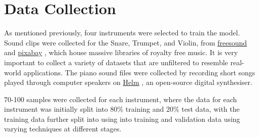 \documentclass[class=report,11pt,crop=false]{standalone}
\begin{document}
\ifstandalone
\tableofcontents
\fi
\section{Data Collection \label{ch: data_collection}}

As mentioned previously, four instruments were selected to train the model. Sound clips were collected for the Snare, Trumpet, and Violin, from \href{https://freesound.org/}{freesound} \cite{freesound} and \href{https://pixabay.com/}{pixabay} \cite{pixabay}, which house massive libraries of royalty free music. It is very important to collect a variety of datasets that are unfiltered to resemble real-world applications. The piano sound files were collected by recording short songs played through computer speakers on \href{https://tytel.org/helm/}{Helm} \cite{tytel2018Helm}, an open-source digital synthesiser.

70-100 samples were collected for each instrument, where the data for each instrument was initially split into 80\% training and 20\% test data, with the training data further split into using into training and validation data using varying techniques at different stages.

\ifstandalone

\printnoidxglossary[type=\acronymtype,nonumberlist]
\fi
\end{document}
